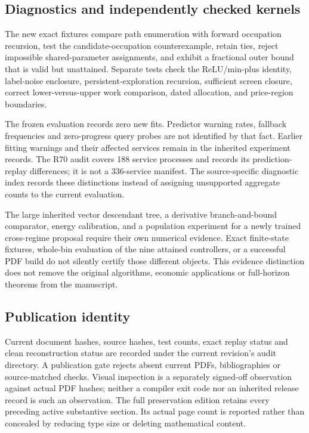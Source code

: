 

\subsection{Diagnostics and independently checked kernels}
The new exact fixtures compare path enumeration with forward occupation recursion, test the candidate-occupation counterexample, retain ties, reject impossible shared-parameter assignments, and exhibit a fractional outer bound that is valid but unattained. Separate tests check the ReLU/min-plus identity, label-noise enclosure, persistent-exploration recursion, sufficient screen closure, correct lower-versus-upper work comparison, dated allocation, and price-region boundaries.

The frozen evaluation records zero new fits. Predictor warning rates, fallback frequencies and zero-progress query probes are not identified by that fact. Earlier fitting warnings and their affected services remain in the inherited experiment records. The R70 audit covers 188 service processes and records its prediction-replay differences; it is not a 336-service manifest. The source-specific diagnostic index records these distinctions instead of assigning unsupported aggregate counts to the current evaluation.

The large inherited vector descendant tree, a derivative branch-and-bound comparator, energy calibration, and a population experiment for a newly trained cross-regime proposal require their own numerical evidence. Exact finite-state fixtures, whole-bin evaluation of the nine attained controllers, or a successful PDF build do not silently certify those different objects. This evidence distinction does not remove the original algorithms, economic applications or full-horizon theorems from the manuscript.

\subsection{Publication identity}
Current document hashes, source hashes, test counts, exact replay status and clean reconstruction status are recorded under the current revision's audit directory. A publication gate rejects absent current PDFs, bibliographies or source-matched checks. Visual inspection is a separately signed-off observation against actual PDF hashes; neither a compiler exit code nor an inherited release record is such an observation. The full preservation edition retains every preceding active substantive section. Its actual page count is reported rather than concealed by reducing type size or deleting mathematical content.
